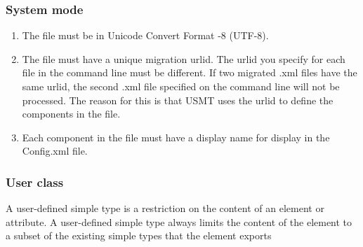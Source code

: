 \subsubsection{System mode}

\begin{enumerate}
    \item The file must be in Unicode Convert Format -8 (UTF-8).
    \item {
      The file must have a unique migration urlid.
      The urlid you specify for each file in the command line must be different.
      If two migrated .xml files have the same urlid, the second .xml file specified on the command line will not be processed.
      The reason for this is that USMT uses the urlid to define the components in the file.
    }
    \item Each component in the file must have a display name for display in the Config.xml file.
\end{enumerate}

\subsubsection{User class}

A user-defined simple type is a restriction on the content of an element or attribute.
A user-defined simple type always limits the content of the element to a subset of the existing simple types that the element exports


